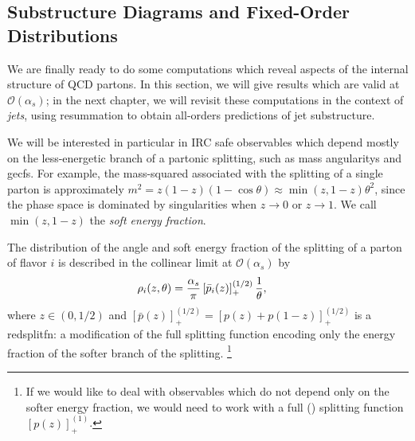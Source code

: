 \subsection{Substructure Diagrams and Fixed-Order Distributions}
\label{sec:fixed-order-substructure}

We are finally ready to do some computations which reveal aspects of the internal structure of QCD partons.
%
In this section, we will give results which are valid at \(\mathcal{O}(\alpha_s)\);
%
in the next chapter, we will revisit these computations in the context of \textit{\glspl{jet}}, using resummation to obtain all-orders predictions of jet substructure.

We will be interested in particular in IRC safe observables which depend mostly on the less-energetic branch of a partonic splitting, such as mass \glspl{angularity} and \glspl{gecf}.
%
For example, the mass-squared associated with the splitting of a single parton is approximately \(m^2 = z(1-z)(1-\cos\theta) \approx \min(z, 1-z) \theta^2\), since the phase space is dominated by singularities when \(z\to 0\) or \(z \to 1\).
%
We call \(\min(z, 1-z)\) the \textit{soft energy fraction}.

The distribution of the angle and soft energy fraction of the splitting of a parton of flavor \(i\) is described in the collinear limit at \(\mathcal{O}(\alpha_s)\) by
%
\begin{align}
    \label{eq:emission-probability}
    \rho_{i}(z,\theta)
    &=
    \frac{\alpha_s}{\pi}
    \le[\bar{p}_i(z)\ri]^{(1/2)}_+ \frac{1}{\theta}
    ,
\end{align}
where \(z\in(0, 1/2)\) and \([\bar{p}(z)]^{(1/2)}_+ = [p(z) + p(1-z)]^{(1/2)}_+\) is a  \gls{redsplitfn}:
%
a modification of the full splitting function encoding only the energy fraction of the softer branch of the splitting.%
\footnote{
   If we would like to deal with observables which do not depend only on the softer energy fraction, we would need to work with a full () splitting function \([p(z)]^{(1)}_+\).
}

